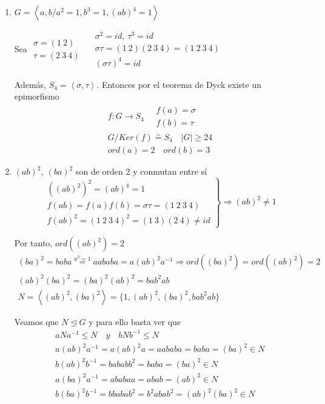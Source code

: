 \documentclass{article}
\begin{document}
\begin{enumerate}[(1)]
\item $G=\left\langle a,b/a^2=1,b^3=1,(ab)^4=1\right\rangle$

Sea $\left.\begin{array}{c}
\sigma=(1\:2)\\
\tau=(2\:3\:4)
\end{array}\right.\quad \left.\begin{array}{c}
\sigma^2=id,\:\tau^3=id\\
\sigma\tau=(1\:2)(2\:3\:4)=(1\:2\:3\:4)\\
(\sigma\tau)^4=id
\end{array}\right.$


Además, $S_4=\left\langle\sigma,\tau\right\rangle$. Entonces por el teorema de Dyck existe un epimorfismo
\begin{gather*}
f:G\longrightarrow S_4\quad \left.\begin{array}{c}
f(a)=\sigma \\
f(b)=\tau
\end{array}\right.\\
G/Ker(f)\overset{\sim}{=} S_4\quad |G|\geq 24 \\
ord(a)=2\quad ord(b)=3
\end{gather*}

\item $(ab)^2,\:(ba)^2$ son de orden 2 y conmutan entre sí
\begin{equation*}
\left.\begin{array}{c}
((ab)^2)^2=(ab)^4=1\\
f(ab)=f(a)f(b)=\sigma\tau =(1\:2\:3\:4)\\
f(ab)^2=(1\:2\:3\:4)^2=(1\:3)(2\:4)\neq id
\end{array}\right\rbrace \Rightarrow (ab)^2\neq 1
\end{equation*}

Por tanto, $ord((ab)^2)=2$
\begin{gather*}
(ba)^2=baba\overset{a^2=1}{=}aababa=a(ab)^2a^{-1}\Rightarrow ord((ba)^2)=ord((ab)^2)=2\\
(ab)^2(ba)^2=(ba)^2(ab)^2=bab^2ab \\
N=\left\langle (ab)^2,(ba)^2\right\rangle=\{1,(ab)^2,(ba)^2,bab^2ab\}
\end{gather*}

Veamos que $N\unlhd G$ y para ello basta ver que
\begin{gather*}
aNa^{-1}\leq N\quad y\quad bNb^{-1}\leq N\\
a(ab)^2a^{-1}=a(ab)^2a=aababa=baba=(ba)^2\in N\\
b(ab)^2b^{-1}=bababb^2=baba=(ba)^2\in N\\
a(ba)^2a^{-1}=ababaa=abab=(ab)^2\in N\\
b(ba)^2b^{-1}=bbabab^2=b^2abab^2=(ab)^2(ba)^2\in N
\end{gather*}


\end{enumerate}
\end{document}
